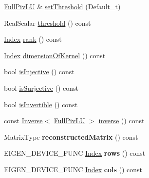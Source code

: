 \begin{DoxyCompactItemize}
\item 
\hyperlink{group___l_u___module_class_eigen_1_1_full_piv_l_u}{Full\+Piv\+LU} \& \hyperlink{group___l_u___module_a1b5e30add3dfb6625da1213d68418f44}{set\+Threshold} (Default\+\_\+t)
\item 
Real\+Scalar \hyperlink{group___l_u___module_ad77539203694f2d85ff7d11616e5a0a5}{threshold} () const
\item 
\hyperlink{group___core___module_a554f30542cc2316add4b1ea0a492ff02}{Index} \hyperlink{group___l_u___module_a67a870aa69e699e058d04802ba0bdad9}{rank} () const
\item 
\hyperlink{group___core___module_a554f30542cc2316add4b1ea0a492ff02}{Index} \hyperlink{group___l_u___module_a64e191225834e91161ea53ad4b78167b}{dimension\+Of\+Kernel} () const
\item 
bool \hyperlink{group___l_u___module_ab13992c852aa593461d9b81790b56667}{is\+Injective} () const
\item 
bool \hyperlink{group___l_u___module_a1f6222875fc3a181ee1544b9b36dfda5}{is\+Surjective} () const
\item 
bool \hyperlink{group___l_u___module_afdf2579c93473650f2ef2a47a376c4a0}{is\+Invertible} () const
\item 
const \hyperlink{class_eigen_1_1_inverse}{Inverse}$<$ \hyperlink{group___l_u___module_class_eigen_1_1_full_piv_l_u}{Full\+Piv\+LU} $>$ \hyperlink{group___l_u___module_ae6f4bb55f859f6353f99cf15ecff4b25}{inverse} () const
\item 
\mbox{\label{group___l_u___module_af07411d1fc0a52c2719eff1a9347d68f}} 
Matrix\+Type {\bfseries reconstructed\+Matrix} () const
\item 
\mbox{\label{group___l_u___module_a3e6a55cd997c2a16fa6cd81be321c916}} 
E\+I\+G\+E\+N\+\_\+\+D\+E\+V\+I\+C\+E\+\_\+\+F\+U\+NC \hyperlink{group___core___module_a554f30542cc2316add4b1ea0a492ff02}{Index} {\bfseries rows} () const
\item 
\mbox{\label{group___l_u___module_ab775ce41ec3e916ad86868f413c20e85}} 
E\+I\+G\+E\+N\+\_\+\+D\+E\+V\+I\+C\+E\+\_\+\+F\+U\+NC \hyperlink{group___core___module_a554f30542cc2316add4b1ea0a492ff02}{Index} {\bfseries cols} () const
\item 
\mbox{\label{group___l_u___module_aae839fc52d4c930e6d18c973d9f708cd}} 

\end{DoxyCompactItemize}
